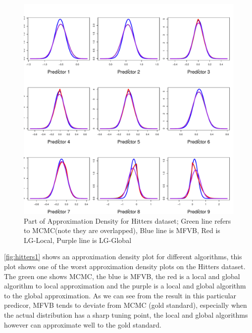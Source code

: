 \begin{figure}[h]
	\centering
	\includegraphics[page = 2, width=\linewidth,keepaspectratio]{lasso_densities_Hitters.pdf}
	\caption{Part of Approximation Density for Hitters dataset; Green line refers to MCMC(note they are overlapped), Blue line is MFVB, Red is LG-Local, Purple line is LG-Global}
	\label{fig:hitters1}
\end{figure}


\autoref{fig:hitters1} shows an approximation density plot for different algorithms, this plot shows one of the worst approximation density plots on the Hitters dataset. The green one shows MCMC, the blue is MFVB, the red is a local and global algorithm to local approximation and the purple is a local and global algorithm to the global approximation. As we can see from the result in this particular predicor, MFVB tends to deviate from MCMC (gold standard), especially when the actual distribution has a sharp tuning point, the local and global algorithms however  can approximate well to the gold standard.

